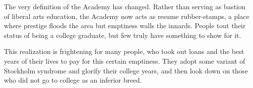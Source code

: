 \documentclass[12pt,letterpaper]{article}
\begin{document}
%
%

The very definition of the Academy has changed.  Rather than serving as bastion of liberal arts education, the Academy now acts as resume rubber-stamps, a place where prestige floods the area but emptiness walls the innards.  People tout their status of being a college graduate, but few truly have something to show for it.

This realization is frightening for many people, who took out loans and the best years of their lives to pay for this certain emptiness.  They adopt some variant of Stockholm syndrome and glorify their college years, and then look down on those who did not go to college as an inferior breed.





%
%
%

\end{document}

